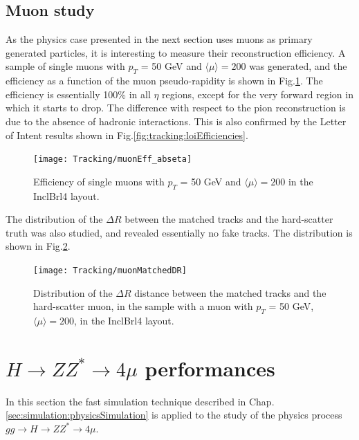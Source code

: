 \documentclass[a4paper,twoside,12pt]{book}
\begin{document}
\section{Muon study}
As the physics case presented
in the next section uses muons as primary generated particles, it is interesting to measure their reconstruction efficiency. A sample of 
single muons with $p_{T}$ = 50 GeV and $\langle\mu\rangle = 200$ was generated, and the efficiency as a function of the muon pseudo-rapidity is
shown in \mbox{Fig.\ref{fig:tracking:muonEff_abseta}}. The efficiency is essentially 100\% in all $\eta$ regions, except for the very forward region in which it starts to drop.
The difference with respect to the pion reconstruction is due to the absence of hadronic interactions. This is also confirmed by the Letter of Intent\cite{loi} results shown in Fig.\ref{fig:tracking:loiEfficiencies}.\\

\begin{figure}
\centering
\texttt{[image: Tracking/muonEff\_abseta]}
\caption{Efficiency of single muons with $p_{T}$ = 50 GeV and $\langle\mu\rangle = 200$ in the InclBrl4 layout.}
\label{fig:tracking:muonEff_abseta}
\end{figure} 

The distribution of the $\Delta R$ between the matched tracks and the hard-scatter truth was also studied, and revealed essentially no fake tracks. The distribution is
shown in Fig.\ref{fig:tracking:muonMatchedDR}.\\

\begin{figure}
\centering
\texttt{[image: Tracking/muonMatchedDR]}
\caption{Distribution of the $\Delta R$ distance between the matched tracks and the hard-scatter muon, in the sample with a muon with $p_{T}$ = 50 GeV, $\langle\mu\rangle = 200$, in the InclBrl4 layout.}
\label{fig:tracking:muonMatchedDR}
\end{figure} 


\clearpage

\chapter{$H \rightarrow ZZ^* \rightarrow 4\mu$ performances}\label{sec:HZZ4mu}
In this section the fast simulation technique described in Chap.\ref{sec:simulation:physicsSimulation} is
applied to the study of the physics process $gg \rightarrow H \rightarrow ZZ^* \rightarrow 4\mu$. \\
\end{document}
